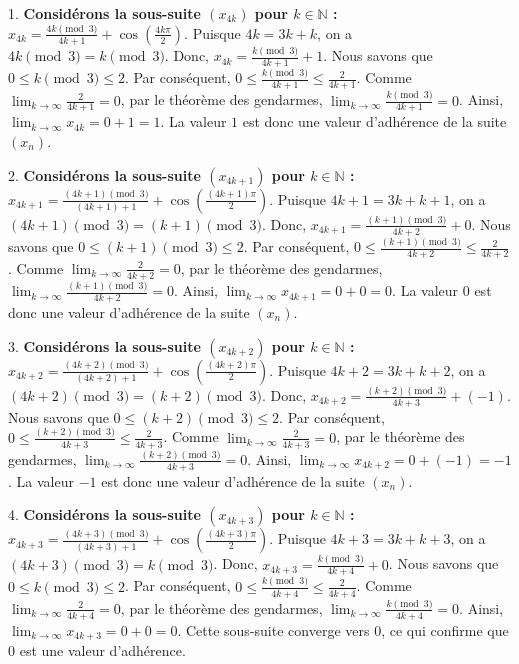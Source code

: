 \documentclass{report}
\begin{document}
1.  \textbf{Considérons la sous-suite $(x_{4k})$ pour $k \in \mathbb{N}$ :}
    $x_{4k} = \frac{4k \pmod 3}{4k+1} + \cos\left(\frac{4k\pi}{2}\right)$.
    Puisque $4k = 3k + k$, on a $4k \pmod 3 = k \pmod 3$.
    Donc, $x_{4k} = \frac{k \pmod 3}{4k+1} + 1$.
    Nous savons que $0 \le k \pmod 3 \le 2$. Par conséquent, $0 \le \frac{k \pmod 3}{4k+1} \le \frac{2}{4k+1}$.
    Comme $\lim_{k \to \infty} \frac{2}{4k+1} = 0$, par le théorème des gendarmes, $\lim_{k \to \infty} \frac{k \pmod 3}{4k+1} = 0$.
    Ainsi, $\lim_{k \to \infty} x_{4k} = 0 + 1 = 1$.
    La valeur $1$ est donc une valeur d'adhérence de la suite $(x_n)$.

2.  \textbf{Considérons la sous-suite $(x_{4k+1})$ pour $k \in \mathbb{N}$ :}
    $x_{4k+1} = \frac{(4k+1) \pmod 3}{(4k+1)+1} + \cos\left(\frac{(4k+1)\pi}{2}\right)$.
    Puisque $4k+1 = 3k + k + 1$, on a $(4k+1) \pmod 3 = (k+1) \pmod 3$.
    Donc, $x_{4k+1} = \frac{(k+1) \pmod 3}{4k+2} + 0$.
    Nous savons que $0 \le (k+1) \pmod 3 \le 2$. Par conséquent, $0 \le \frac{(k+1) \pmod 3}{4k+2} \le \frac{2}{4k+2}$.
    Comme $\lim_{k \to \infty} \frac{2}{4k+2} = 0$, par le théorème des gendarmes, $\lim_{k \to \infty} \frac{(k+1) \pmod 3}{4k+2} = 0$.
    Ainsi, $\lim_{k \to \infty} x_{4k+1} = 0 + 0 = 0$.
    La valeur $0$ est donc une valeur d'adhérence de la suite $(x_n)$.

3.  \textbf{Considérons la sous-suite $(x_{4k+2})$ pour $k \in \mathbb{N}$ :}
    $x_{4k+2} = \frac{(4k+2) \pmod 3}{(4k+2)+1} + \cos\left(\frac{(4k+2)\pi}{2}\right)$.
    Puisque $4k+2 = 3k + k + 2$, on a $(4k+2) \pmod 3 = (k+2) \pmod 3$.
    Donc, $x_{4k+2} = \frac{(k+2) \pmod 3}{4k+3} + (-1)$.
    Nous savons que $0 \le (k+2) \pmod 3 \le 2$. Par conséquent, $0 \le \frac{(k+2) \pmod 3}{4k+3} \le \frac{2}{4k+3}$.
    Comme $\lim_{k \to \infty} \frac{2}{4k+3} = 0$, par le théorème des gendarmes, $\lim_{k \to \infty} \frac{(k+2) \pmod 3}{4k+3} = 0$.
    Ainsi, $\lim_{k \to \infty} x_{4k+2} = 0 + (-1) = -1$.
    La valeur $-1$ est donc une valeur d'adhérence de la suite $(x_n)$.

4.  \textbf{Considérons la sous-suite $(x_{4k+3})$ pour $k \in \mathbb{N}$ :}
    $x_{4k+3} = \frac{(4k+3) \pmod 3}{(4k+3)+1} + \cos\left(\frac{(4k+3)\pi}{2}\right)$.
    Puisque $4k+3 = 3k + k + 3$, on a $(4k+3) \pmod 3 = k \pmod 3$.
    Donc, $x_{4k+3} = \frac{k \pmod 3}{4k+4} + 0$.
    Nous savons que $0 \le k \pmod 3 \le 2$. Par conséquent, $0 \le \frac{k \pmod 3}{4k+4} \le \frac{2}{4k+4}$.
    Comme $\lim_{k \to \infty} \frac{2}{4k+4} = 0$, par le théorème des gendarmes, $\lim_{k \to \infty} \frac{k \pmod 3}{4k+4} = 0$.
    Ainsi, $\lim_{k \to \infty} x_{4k+3} = 0 + 0 = 0$.
    Cette sous-suite converge vers $0$, ce qui confirme que $0$ est une valeur d'adhérence.
\end{document}
